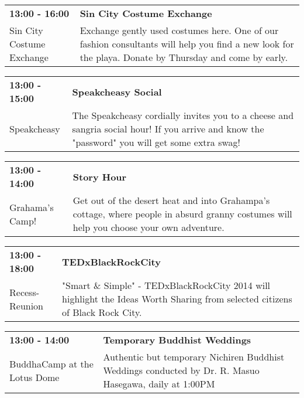 \begin{tabular}{ p{1in} p{2.2in} }
    \textbf{13:00 - 16:00} & \textbf{Sin City Costume Exchange} \\
    Sin City Costume Exchange \newline  & Exchange gently used costumes here. One of our fashion consultants will help you find a new look for the playa. Donate by Thursday and come by early. \\
    \hline 
\end{tabular}
    
\begin{tabular}{ p{1in} p{2.2in} }
    \textbf{13:00 - 15:00} & \textbf{Speakcheasy Social} \\
    Speakcheasy \newline  & The Speakcheasy cordially invites you to a cheese and sangria social hour! If you arrive and know the "password" you will get some extra swag! \\
    \hline 
\end{tabular}
    
\begin{tabular}{ p{1in} p{2.2in} }
    \textbf{13:00 - 14:00} & \textbf{Story Hour} \\
    Grahama's Camp! \newline  & Get out of the desert heat and into Grahampa's cottage, where people in absurd granny costumes will help you choose your own adventure. \\
    \hline 
\end{tabular}
    
\begin{tabular}{ p{1in} p{2.2in} }
    \textbf{13:00 - 18:00} & \textbf{TEDxBlackRockCity} \\
    Recess-Reunion \newline  & "Smart \& Simple" - TEDxBlackRockCity 2014 will highlight the Ideas Worth Sharing from selected citizens of Black Rock City. \\
    \hline 
\end{tabular}
    
\begin{tabular}{ p{1in} p{2.2in} }
    \textbf{13:00 - 14:00} & \textbf{Temporary Buddhist Weddings} \\
    BuddhaCamp at the Lotus Dome \newline  & Authentic but temporary Nichiren Buddhist Weddings conducted by Dr. R. Masuo Hasegawa, daily at 1:00PM \\
    \hline 
\end{tabular}
    
